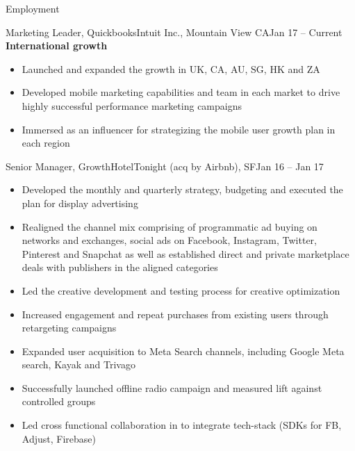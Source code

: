 \documentclass[]{mcdowellcv}
\begin{document}
\begin{cvsection}{Employment}
\begin{cvsubsection}{Marketing Leader, Quickbooks}{Intuit Inc., Mountain View CA}{Jan 17 -- Current}
		\textbf{International growth}
		\begin{itemize}
		\item Launched and expanded the growth in UK, CA, AU, SG, HK and ZA
		\item Developed mobile marketing capabilities and team in each market to drive highly successful performance marketing campaigns
		\item Immersed as an influencer for strategizing the mobile user growth plan in each region
		\end{itemize}
		
		\end{cvsubsection}
		
		\begin{cvsubsection}{Senior Manager, Growth}{HotelTonight (acq by Airbnb), SF}{Jan 16 -- Jan 17}	
			\begin{itemize}
			\item Developed the monthly and quarterly strategy, budgeting and executed the plan for display advertising
			\item Realigned the channel mix comprising of programmatic ad buying on networks and exchanges, social ads on Facebook, Instagram, Twitter, Pinterest and Snapchat as well as established direct and private marketplace deals with publishers in the aligned categories
			\item Led the creative development and testing process for creative optimization
			\item Increased engagement and repeat purchases from existing users through retargeting campaigns
			\item Expanded user acquisition to Meta Search channels, including Google Meta search, Kayak and Trivago
			\item Successfully launched offline radio campaign and measured lift against controlled groups
			\item Led cross functional collaboration in to integrate tech-stack (SDKs for FB, Adjust, Firebase) 

			\end{itemize}
		\end{cvsubsection}
		

\end{cvsection}
\end{document}
